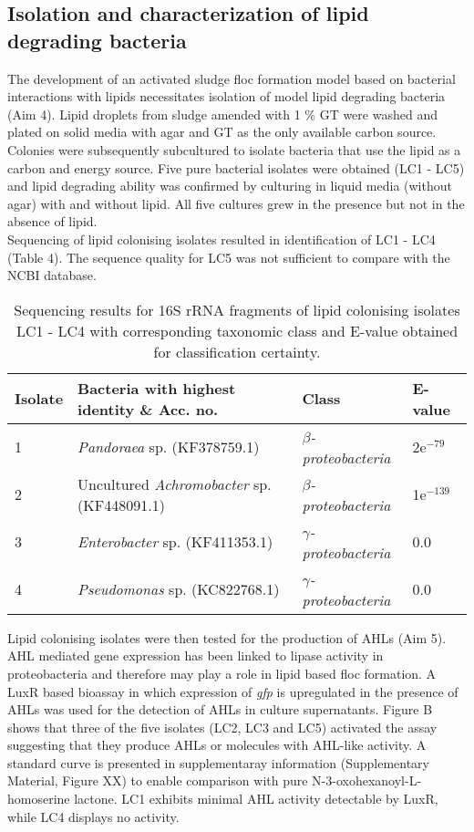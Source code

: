 \documentclass[twoside]{article}
\begin{document}
\subsection{Isolation and characterization of lipid degrading bacteria}

The development of an activated sludge floc formation model based on bacterial interactions with lipids necessitates isolation of model lipid degrading bacteria (Aim 4). Lipid droplets from sludge amended with 1 \% GT were washed and plated on solid media with agar and GT as the only available carbon source. Colonies were subsequently subcultured to isolate bacteria that use the lipid as a carbon and energy source. Five pure bacterial isolates were obtained (LC1 - LC5) and lipid degrading ability was confirmed by culturing in liquid media (without agar) with and without lipid. All five cultures grew in the presence but not in the absence of lipid. \\

Sequencing of lipid colonising isolates resulted in identification of LC1 - LC4 (Table 4). The sequence quality for LC5 was not sufficient to compare with the NCBI database.

\begin{table}
\caption{Sequencing results for 16S rRNA fragments of lipid colonising isolates LC1 - LC4 with corresponding taxonomic class and E-value obtained for classification certainty.}
\begin{tabular}{ | l | p{7.8cm} | p{3cm} | l | }
\hline
Isolate & Bacteria with highest identity \& Acc. no. & Class & E-value \\
\hline
1 &  \emph{Pandoraea} sp. (KF378759.1) & \emph{$\beta$-proteobacteria} & 2e$^{-79}$ \\
\hline
2 & Uncultured \emph{Achromobacter} sp. (KF448091.1) & \emph{$\beta$-proteobacteria} & 1e$^{-139}$ \\
\hline
3 & \emph{Enterobacter} sp. (KF411353.1) & \emph{$\gamma$-proteobacteria} & 0.0 \\
\hline
4 & \emph{Pseudomonas} sp. (KC822768.1) & \emph{$\gamma$-proteobacteria} & 0.0 \\
\hline
\end{tabular}
\end{table}

\FloatBarrier

Lipid colonising isolates were then tested for the production of AHLs (Aim 5). AHL mediated gene expression has been linked to lipase activity in proteobacteria and therefore may play a role in lipid based floc formation. A LuxR based bioassay in which expression of \emph{gfp} is upregulated in the presence of AHLs was used for the detection of AHLs in culture supernatants. Figure B shows that three of the five isolates (LC2, LC3 and LC5) activated the assay suggesting that they produce AHLs or molecules with AHL-like activity. A standard curve is presented in supplementaray information (Supplementary Material, Figure XX) to enable comparison with pure N-3-oxohexanoyl-L-homoserine lactone. LC1 exhibits minimal AHL activity detectable by LuxR, while LC4 displays no activity.\\
\end{document}
